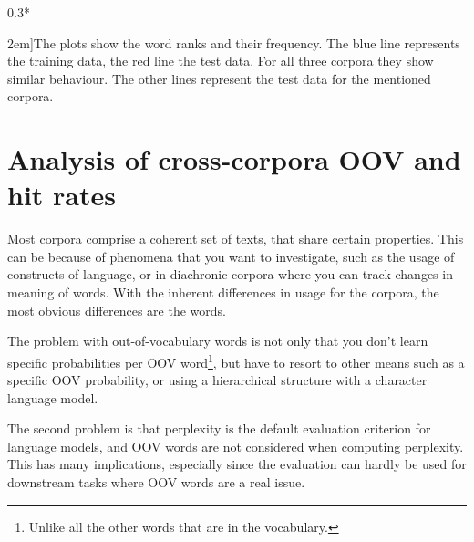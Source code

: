 \begin{figure*}
{\begin{scaletikzpicturetowidth}{0.3*\textwidth}
  	\end{scaletikzpicturetowidth}}
  	
  	\caption[][2em]{The plots show the word ranks and their frequency. The blue line represents the training data, the red line the test data. For all three corpora they show similar behaviour. The other lines represent the test data for the mentioned corpora.}
  \end{figure*}
  
  
  
    
    
    
    
    \section{Analysis of cross-corpora OOV and hit rates}
Most corpora comprise a coherent set of texts, that share certain properties. This can be because of phenomena that you want to investigate, such as the usage of constructs of language, or in diachronic corpora where you can track changes in meaning of words. With the inherent differences in usage for the corpora, the most obvious differences are the words.

The problem with out-of-vocabulary words is not only that you don't learn specific probabilities per OOV word\footnote{Unlike all the other words that are in the vocabulary.}, but have to resort to other means such as a specific OOV probability, or using a hierarchical structure with a character language model.

The second problem is that perplexity is the default evaluation criterion for language models, and OOV words are not considered when computing perplexity. This has many implications, especially since the evaluation can hardly be used for downstream tasks where OOV words are a real issue.

